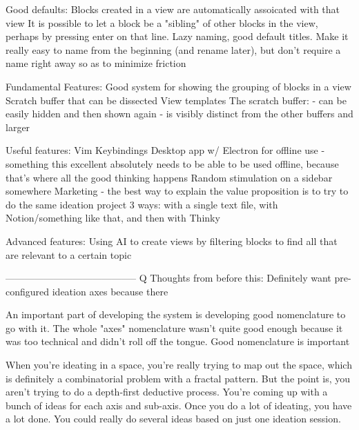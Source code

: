 Good defaults:
Blocks created in a view are automatically assoicated with that view
It is possible to let a block be a "sibling" of other blocks in the view, perhaps by pressing enter on that line.
Lazy naming, good default titles. Make it really easy to name from the beginning (and rename later), but don't require a name right away so as to minimize friction


Fundamental Features:
Good system for showing the grouping of blocks in a view
Scratch buffer that can be dissected
View templates
The scratch buffer:
- can be easily hidden and then shown again
- is visibly distinct from the other buffers and larger


Useful features:
Vim Keybindings
Desktop app w/ Electron for offline use - something this excellent absolutely needs to be able to be used offline, because that's where all the good thinking happens
Random stimulation on a sidebar somewhere
Marketing - the best way to explain the value proposition is to try to do the same ideation project 3 ways: with a single text file, with Notion/something like that, and then with Thinky

Advanced features:
Using AI to create views by filtering blocks to find all that are relevant to a certain topic


-----------------------------------------
Q Thoughts from before this:
Definitely want pre-configured ideation axes because there

An important part of developing the system is developing good nomenclature to go with it. The whole "axes" nomenclature wasn't quite good enough because it was too technical and didn't roll off the tongue. Good nomenclature is important

When you're ideating in a space, you're really trying to map out the space, which is definitely a combinatorial problem with a fractal pattern. But the point is, you aren't trying to do a depth-first deductive process. You're coming up with a bunch of ideas for each axis and sub-axis. Once you do a lot of ideating, you have a lot done. You could really do several ideas based on just one ideation session.

